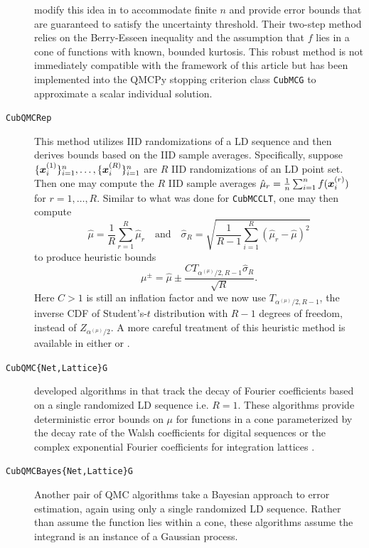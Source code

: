 \documentclass{article}[12pt]
\begin{document}
\begin{description}
    \citeauthor{cubmcg} modify this idea in \cite{cubmcg} to accommodate  finite $n$ and provide error bounds that are guaranteed to satisfy the uncertainty threshold. Their two-step method relies on the Berry-Esseen inequality and the assumption that $f$ lies in a cone of functions with known, bounded kurtosis. This robust method is not immediately compatible with the framework of this article but has been implemented into the QMCPy stopping criterion class \texttt{CubMCG} to approximate a scalar individual solution.
    \item[\texttt{CubQMCRep}] This method utilizes IID randomizations of a LD sequence and then derives bounds based on the IID sample averages. Specifically, suppose $\{\boldsymbol{x}_i^{(1)}\}_{i=1}^n,\dots,\{\boldsymbol{x}_i^{(R)}\}_{i=1}^n$ are $R$ IID randomizations of an LD point set. Then one may compute the $R$ IID sample averages $\hat{\mu}_r = \frac{1}{n} \sum_{i=1}^n f(\boldsymbol{x}_i^{(r)})$ for $r = 1,\dots,R$. Similar to what was done for \texttt{CubMCCLT}, one may then compute 
    $$\hat{\mu} = \frac{1}{R} \sum_{r=1}^R \hat{\mu}_r \quad\text{and}\quad \hat{\sigma}_R = \sqrt{\frac{1}{R-1}\sum_{i=1}^R(\hat{\mu}_r - \hat{\mu})^2}$$
    to produce heuristic bounds  
    $$\mu^\pm = \hat{\mu} \pm \frac{C T_{\alpha^{(\mu)}/2,R-1} \hat{\sigma}_R}{\sqrt{R}}.$$
    Here $C>1$ is still an inflation factor and we now use $T_{\alpha^{(\mu)}/2,R-1}$, the inverse CDF of Student's-$t$ distribution with $R-1$ degrees of freedom, instead of $Z_{\alpha^{(\mu)}/2}$.
    A more careful treatment of this heuristic method is available in either \cite[Chapter 17]{mcbook} or \cite{qmc4pde_preprint}. 
    \item[\texttt{CubQMC\{Net,Lattice\}G}] \citeauthor{cubqmclattice} developed algorithms in \cite{adaptive_qmc} that track the decay of Fourier coefficients based on a single randomized LD sequence i.e. $R=1$. These algorithms provide deterministic error bounds on $\mu$ for functions in a cone parameterized by the decay rate of the Walsh coefficients for digital sequences \cite{cubqmcsobol} or the complex exponential Fourier coefficients for integration lattices \cite{cubqmclattice}. %
    \item[\texttt{CubQMCBayes\{Net,Lattice\}G}] Another pair of QMC algorithms take a Bayesian approach to error estimation, again using only a single randomized LD sequence. Rather than assume the function lies within a cone, these algorithms assume the integrand is an instance of a Gaussian process. 

\end{description}
\end{document}
